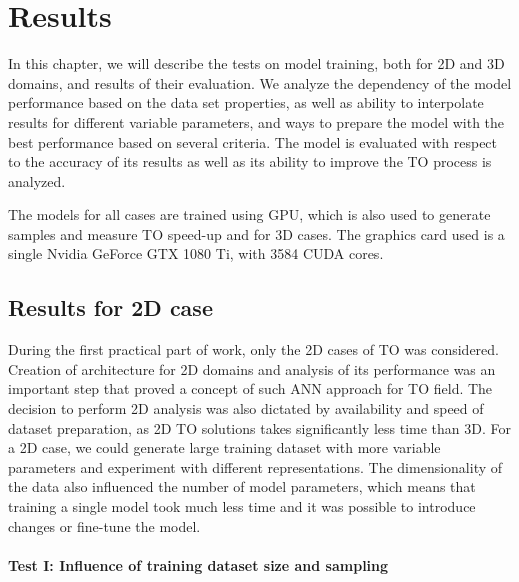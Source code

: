 
\chapter{Results}
\label{chapter:Results}

In this chapter, we will describe the tests on model training, both for 2D and 3D domains, and results of their evaluation.
We analyze the dependency of the model performance based on the data set properties, as well as ability to interpolate results for different variable parameters, and ways to prepare the model with the best performance based on several criteria. 
The model is evaluated with respect to the accuracy of its results as well as its ability to improve the TO process is analyzed.
\medskip

The models for all cases are trained using GPU, which is also used to generate samples and measure TO speed-up and for 3D cases.
The graphics card used is a single Nvidia GeForce GTX 1080 Ti, with 3584 CUDA cores. 


\section{Results for 2D case}

During the first practical part of work, only the 2D cases of TO was considered.
Creation of architecture for 2D domains and analysis of its performance was an important step that proved a concept of such ANN approach for TO field.
The decision to perform 2D analysis was also dictated by availability and speed of dataset preparation, as 2D TO solutions takes significantly less time than 3D. 
For a 2D case, we could generate large training dataset with more variable parameters and experiment with different representations.
The dimensionality of the data also influenced the number of model parameters, which means that training a single model took much less time and it was possible to introduce changes or fine-tune the model.

\medskip

\subsubsection{Test I: Influence of training dataset size and sampling}

